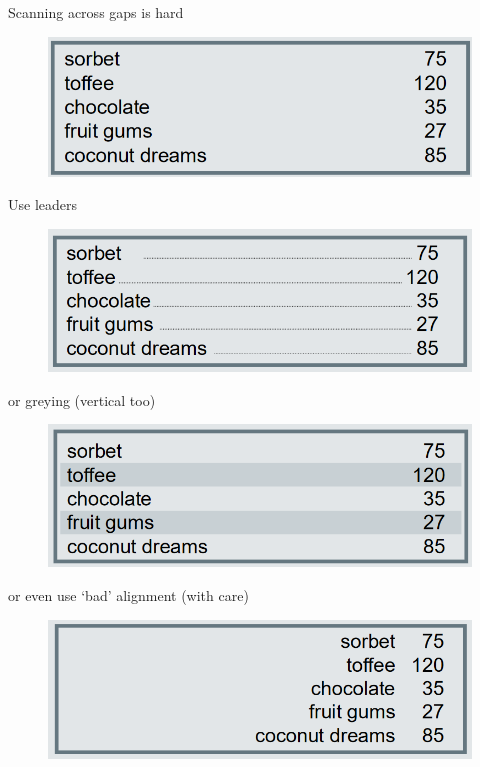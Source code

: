 \documentclass[]{project_plan}
\begin{document}
Scanning across gaps is hard

\begin{figure}[ht!]
  \includegraphics[width=40em]{graphic_design_multiple_columns_bad.png}
\end{figure}

Use leaders

\begin{figure}[ht!]
  \includegraphics[width=40em]{graphic_design_multiple_columns_leaders.png}
\end{figure}

\newpage

or greying (vertical too)

\begin{figure}[ht!]
  \includegraphics[width=40em]{graphic_design_multiple_columns_greying.png}
\end{figure}

or even use ‘bad’ alignment (with care)

\begin{figure}[ht!]
  \includegraphics[width=40em]{graphic_design_multiple_columns_bad_alignment.png}
\end{figure}
\end{document}
